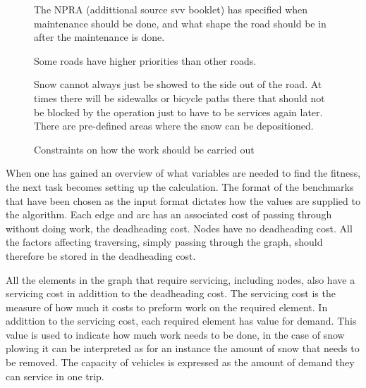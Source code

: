\begin{figure}[thbp]
\caption{Constraints on how the work should be carried out}
\label{fig:imposed_constraints}
\begin{description}
	\item [Equipment -- Amount of vehicles available.]
	\item [Equipment -- Types of vehicles available.]
	\item [The order the roads are serviced in.] 
	\item [The weather.] The NPRA (addittional source svv booklet) has specified when maintenance should be done, and what shape the road should be in after the maintenance is done.
	\item [The type of road.] Some roads have higher priorities than other roads.
	\item [Where the snow can be stored.] Snow cannot always just be showed to the side out of the road. At times there will be sidewalks or bicycle paths there that should not be blocked by the operation just to have to be services again later. There are pre-defined areas where the snow can be depositioned.
\end{description}
\end{figure}


When one has gained an overview of what variables are needed to find the fitness, the next task becomes setting up the calculation. The format of the benchmarks that have been chosen as the input format dictates how the values are supplied to the algorithm. Each edge and arc has an associated cost of passing through without doing work, the deadheading cost. Nodes have no deadheading cost. All the factors affecting traversing, simply passing through the graph, should therefore be stored in the deadheading cost.

All the elements in the graph that require servicing, including nodes, also have a servicing cost in addittion to the deadheading cost. The servicing cost is the measure of how much it costs to preform work on the required element. In addittion to the servicing cost, each required element has value for demand. This value is used to indicate how much work needs to be done, in the case of snow plowing it can be interpreted as for an instance the amount of snow that needs to be removed. The capacity of vehicles is expressed as the amount of demand they can service in one trip.

